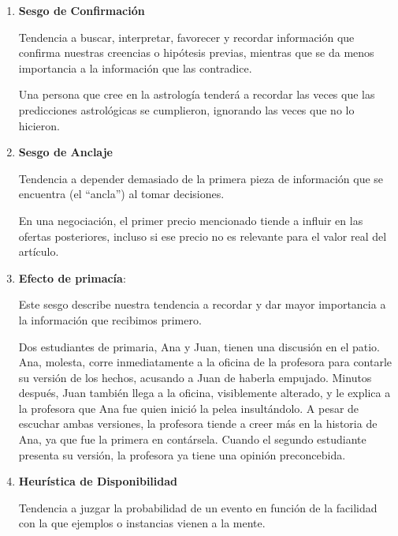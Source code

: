\begin{enumerate}
	\item \textbf{Sesgo de Confirmación}
	
	Tendencia a buscar, interpretar, favorecer y recordar información que confirma nuestras creencias o hipótesis previas, mientras que se da menos importancia a la información que las contradice.
	
	\begin{example}
		Una persona que cree en la astrología tenderá a recordar las veces que las predicciones astrológicas se cumplieron, ignorando las veces que no lo hicieron.
	\end{example}
	
	\item \textbf{Sesgo de Anclaje}
	
	Tendencia a depender demasiado de la primera pieza de información que se encuentra (el ``ancla'') al tomar decisiones.
	
	\begin{example} En una negociación, el primer precio mencionado tiende a influir en las ofertas posteriores, incluso si ese precio no es relevante para el valor real del artículo.
	\end{example}
	
	\item \textbf{Efecto de primacía}:
	
	Este sesgo describe nuestra tendencia a recordar y dar mayor importancia a la información que recibimos primero.
	
	\begin{example}
		Dos estudiantes de primaria, Ana y Juan, tienen una discusión en el patio. Ana, molesta, corre inmediatamente a la oficina de la profesora para contarle su versión de los hechos, acusando a Juan de haberla empujado. Minutos después, Juan también llega a la oficina, visiblemente alterado, y le explica a la profesora que Ana fue quien inició la pelea insultándolo. A pesar de escuchar ambas versiones, la profesora tiende a creer más en la historia de Ana, ya que fue la primera en contársela. Cuando el segundo estudiante presenta su versión, la profesora ya tiene una opinión preconcebida.
	\end{example}
	
	\item \textbf{Heurística de Disponibilidad}
	
	Tendencia a juzgar la probabilidad de un evento en función de la facilidad con la que ejemplos o instancias vienen a la mente.
	

\end{enumerate}
